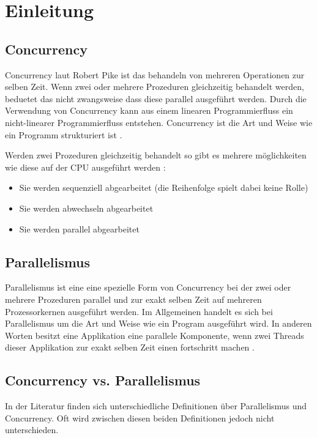 \section{Einleitung}
\label{section:Einleitung}


\subsection{Concurrency}
\label{section:concurrency}

Concurrency laut Robert Pike ist das behandeln von mehreren Operationen zur selben Zeit. Wenn zwei oder mehrere Prozeduren gleichzeitig behandelt werden, beduetet das nicht zwangsweise dass diese parallel ausgeführt werden. Durch die Verwendung von Concurrency kann aus einem linearen Programmierfluss ein nicht-linearer Programmierfluss entstehen. Concurrency ist die Art und Weise wie ein Programm strukturiert ist \cite[]{Pik2013}.

Werden zwei Prozeduren gleichzeitig behandelt so gibt es mehrere möglichkeiten wie diese auf der CPU ausgeführt werden \cite[p. 14]{Erb2012}:

\begin{itemize}
  \item Sie werden sequenziell abgearbeitet (die Reihenfolge spielt dabei keine Rolle)
  \item Sie werden abwechseln abgearbeitet
  \item Sie werden parallel abgearbeitet
\end{itemize}

\subsection{Parallelismus}

Parallelismus ist eine eine spezielle Form von Concurrency bei der zwei oder mehrere Prozeduren parallel und  zur exakt selben Zeit auf mehreren Prozessorkernen ausgeführt werden. Im Allgemeinen handelt es sich bei Parallelismus um die Art und Weise wie ein Program ausgeführt wird. In anderen Worten besitzt eine Applikation eine parallele Komponente, wenn zwei Threads dieser Applikation zur exakt selben Zeit einen fortschritt machen \cite[]{oracle:multithreading}.

\subsection{Concurrency vs. Parallelismus}

In der Literatur finden sich unterschiedliche Definitionen über Parallelismus und Concurrency. Oft wird zwischen diesen beiden Definitionen jedoch nicht unterschieden. 

